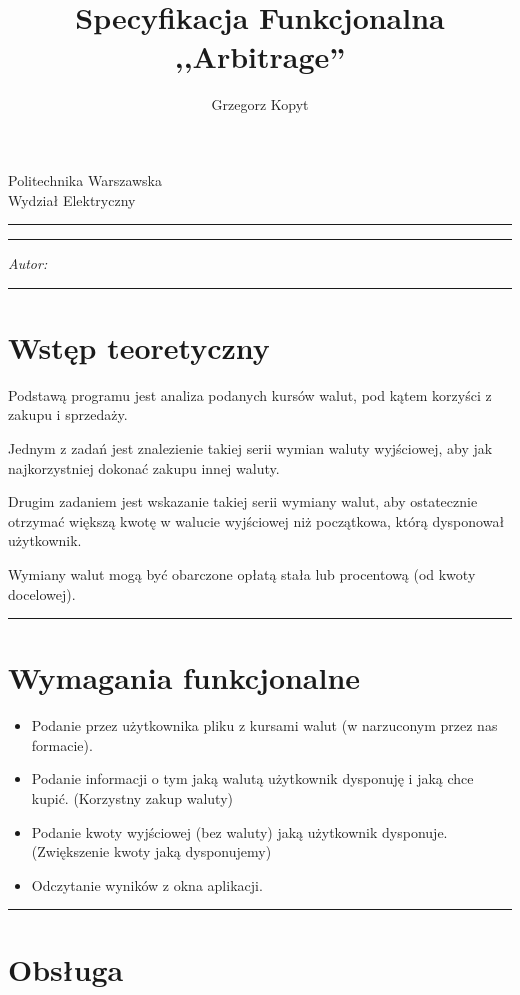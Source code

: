\documentclass[a4paper,11pt]{article}
\author{Grzegorz Kopyt}
\title{Specyfikacja Funkcjonalna \\
,,Arbitrage''}
\makeatletter
\newcommand{\linia}{\rule{\linewidth}{0.4mm}}
\renewcommand{\maketitle}{\begin{titlepage}
    \vspace*{2cm}
    \begin{center}\LARGE
    Politechnika Warszawska\\
    Wydział Elektryczny\\
    \end{center}
    \vspace{5cm}
    \noindent\linia
    \begin{center}
      \LARGE \textsc{\@title}
         \end{center}
     \linia
    \vspace{0.5cm}
    \begin{flushright}
    \begin{minipage}{5cm}
    \textit{Autor:}\\
    \normalsize \textsc{\@author} \par
    \end{minipage}
    \vspace{5cm}
     \end{flushright}
    \vspace*{\stretch{6}}
    \begin{center}
    \@date
    \end{center}
  \end{titlepage}
}
\makeatother
\begin{document}
\maketitle

\tableofcontents
\vspace{1cm}
\noindent\linia
\section{Wstęp teoretyczny}
Podstawą programu jest analiza podanych kursów walut, pod kątem korzyści z zakupu i sprzedaży.

Jednym z zadań jest znalezienie takiej serii wymian waluty wyjściowej, aby jak najkorzystniej dokonać zakupu innej waluty.

Drugim zadaniem jest wskazanie takiej serii wymiany walut, aby ostatecznie otrzymać większą kwotę w walucie wyjściowej niż początkowa, którą dysponował użytkownik.

Wymiany walut mogą być obarczone opłatą stała lub procentową (od kwoty docelowej).

\noindent\linia
\section{Wymagania funkcjonalne}
\begin{itemize}
\item Podanie przez użytkownika pliku z kursami walut (w narzuconym przez nas formacie).
\item Podanie informacji o tym jaką walutą użytkownik dysponuję  i jaką chce kupić. (Korzystny zakup waluty)
\item Podanie kwoty wyjściowej (bez waluty) jaką użytkownik dysponuje. (Zwiększenie kwoty jaką dysponujemy)
\item Odczytanie wyników z okna aplikacji.
\end{itemize}

\noindent\linia
\section{Obsługa}
\end{document}
